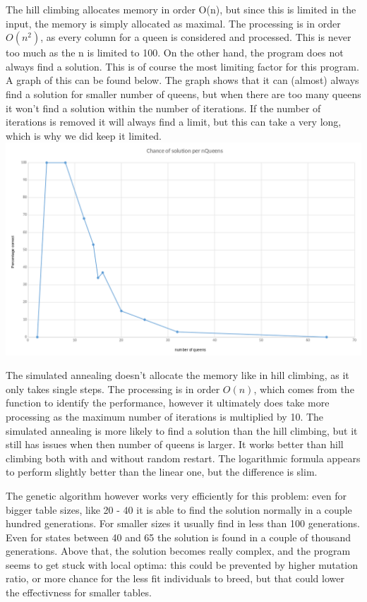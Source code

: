 \documentclass{article}
\begin{document}
The hill climbing allocates memory in order O(n), but since this is limited in the input, the memory is simply allocated as maximal. The processing is in order $O(n^2)$, as every column for a queen is considered and processed. This is never too much as the n is limited to 100. On the other hand, the program does not always find a solution. This is of course the most limiting factor for this program. A graph of this can be found below. The graph shows that it can (almost) always find a solution for smaller number of queens, but when there are too many queens it won't find a solution within the number of iterations. If the number of iterations is removed it will always find a limit, but this can take a very long, which is why we did keep it limited.
\includegraphics[scale=0.2]{./HillClimbGraph.png}

The simulated annealing doesn't allocate the memory like in hill climbing, as it only takes single steps. The processing is in order $O(n)$, which comes from the function to identify the performance, however it ultimately does take more processing as the maximum number of iterations is multiplied by 10. The simulated annealing is more likely to find a solution than the hill climbing, but it still has issues when then number of queens is larger. It works better than hill climbing both with and without random restart. The logarithmic formula appears to perform slightly better than the linear one, but the difference is slim. 

The genetic algorithm however works very efficiently for this problem: even for bigger table sizes, like 20 - 40 it is able to find the solution normally in a couple hundred generations. For smaller sizes it usually find in less than 100 generations. Even for states between 40 and 65 the solution is found in a couple of thousand generations. Above that, the solution becomes really complex, and the program seems to get stuck with local optima: this could be prevented by higher mutation ratio, or more chance for the less fit individuals to breed, but that could lower the effectivness for smaller tables.
\end{document}
